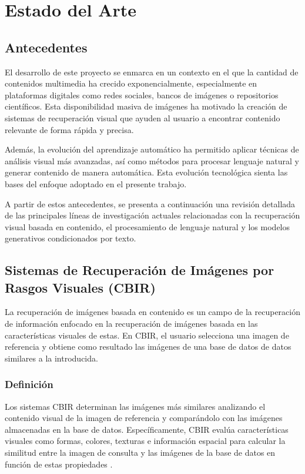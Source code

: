 \section{Estado del Arte}
\subsection{Antecedentes}
El desarrollo de este proyecto se enmarca en un contexto en el que la cantidad de contenidos multimedia ha crecido exponencialmente, especialmente en plataformas digitales como redes sociales, bancos de imágenes o repositorios científicos. Esta disponibilidad masiva de imágenes ha motivado la creación de sistemas de recuperación visual que ayuden al usuario a encontrar contenido relevante de forma rápida y precisa.

Además, la evolución del aprendizaje automático ha permitido aplicar técnicas de análisis visual más avanzadas, así como métodos para procesar lenguaje natural y generar contenido de manera automática. Esta evolución tecnológica sienta las bases del enfoque adoptado en el presente trabajo.

A partir de estos antecedentes, se presenta a continuación una revisión detallada de las principales líneas de investigación actuales relacionadas con la recuperación visual basada en contenido, el procesamiento de lenguaje natural y los modelos generativos condicionados por texto.

\subsection{Sistemas de Recuperación de Imágenes por Rasgos Visuales (CBIR)}
La recuperación de imágenes basada en contenido es un campo de la recuperación de información enfocado en la recuperación de imágenes basada en las características visuales de estas. En CBIR, el usuario selecciona una imagen de referencia y obtiene como resultado las imágenes de una base de datos de datos similares a la introducida.

\subsubsection{Definición}
Los sistemas CBIR determinan las imágenes más similares analizando el contenido visual de la imagen de referencia y comparándolo con las imágenes almacenadas en la base de datos. Específicamente, CBIR evalúa características visuales como formas, colores, texturas e información espacial para calcular la similitud entre la imagen de consulta y las imágenes de la base de datos en función de estas propiedades \cite{baeldung-cbir}.

